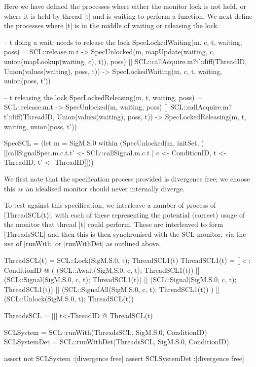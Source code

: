  Here we have defined the processes where either the monitor lock is not held, or where it is held by thread |t| and is waiting to perform a function. We next define the processes where |t| is in the middle of waiting or releasing the lock.

  \begin{cspm}
-- t doing a wait; needs to release the lock
SpecLockedWaiting(m, c, t, waiting, poss) =
      SCL::release.m.t -> 
        SpecUnlocked(m, mapUpdate(waiting, c, union(mapLookup(waiting, c), {t})), 
                    poss)
  [] SCL::callAcquire.m?t':diff(ThreadID, 
                                Union({values(waiting), poss, {t}})) ->
        SpecLockedWaiting(m, c, t, waiting, union(poss, {t'}))

-- t releasing the lock
SpecLockedReleasing(m, t, waiting, poss) =
      SCL::release.m.t -> SpecUnlocked(m, waiting, poss)
  [] SCL::callAcquire.m?t':diff(ThreadID, 
                                Union({values(waiting), poss, {t}})) ->
        SpecLockedReleasing(m, t, waiting, union(poss, {t'}))

SpecSCL = (let m = SigM.S.0 within 
            (SpecUnlocked(m, initSet, {}) 
              [[callSignalSpec.m.c.t.t' <- SCL::callSignal.m.c.t 
                  | c <- ConditionID, t <- ThreadID, t' <- ThreadID]]))
  \end{cspm}

We first note that the specification process provided is divergence free; we choose this as an idealised monitor should never internally diverge. 

To test against this specification, we interleave a number of process of |ThreadSCL(t)|, with each of these representing the potential (correct) usage of the monitor that thread |t| could perform. These are interleaved to form |ThreadsSCL| and then this is then synchronised with the SCL monitor, via the use of |runWith| or |runWithDet| as outlined above.

\begin{cspm}
ThreadSCL(t) = SCL::Lock(SigM.S.0, t); ThreadSCL1(t)
ThreadSCL1(t) =   
  [] c : ConditionID @ 
     (
          (SCL::Await(SigM.S.0, c, t); ThreadSCL1(t))      
      [] (SCL::Signal(SigM.S.0, c, t); ThreadSCL1(t))
      [] (SCL::Signal(SigM.S.0, c, t); ThreadSCL1(t))
      [] (SCL::SignalAll(SigM.S.0, c, t); ThreadSCL1(t))
     )
  [] (SCL::Unlock(SigM.S.0, t); ThreadSCL(t))

ThreadsSCL = ||| t<-ThreadID @ ThreadSCL(t)

SCLSystem = SCL::runWith(ThreadsSCL, SigM.S.0, ConditionID)
SCLSystemDet = SCL::runWithDet(ThreadsSCL, SigM.S.0, ConditionID)

assert not SCLSystem :[divergence free]
assert SCLSystemDet :[divergence free]
\end{cspm}

